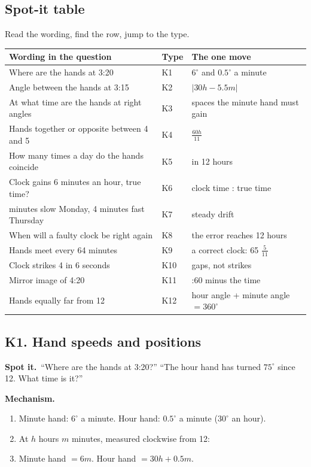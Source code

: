 \documentclass[11pt,a4paper]{article}
\let\oldsubsection\subsection
\renewcommand{\subsection}{\needspace{9\baselineskip}\oldsubsection}
\newcommand{\spot}{\textbf{\color{ember}Spot it.}\ }
\newcommand{\mech}{\textbf{\color{ember}Mechanism.}\ }
\begin{document}
\subsection*{Spot-it table}
Read the wording, find the row, jump to the type.
\begin{center}\small\renewcommand{\arraystretch}{1.18}\setlength{\tabcolsep}{7pt}
\begin{tabularx}{\linewidth}{@{}>{\raggedright\arraybackslash}X l >{\raggedright\arraybackslash}X@{}}
\toprule
\textbf{\color{slate}Wording in the question} & \textbf{\color{slate}Type} & \textbf{\color{slate}The one move} \\ \midrule
Where are the hands at 3:20 & K1 & $6^\circ$ and $0.5^\circ$ a minute \\
Angle between the hands at 3:15 & K2 & $|30h - 5.5m|$ \\
At what time are the hands at right angles & K3 & spaces the minute hand must gain \\
Hands together or opposite between 4 and 5 & K4 & $\frac{60h}{11}$ \\
How many times a day do the hands coincide & K5 & 11 in 12 hours \\
Clock gains 6 minutes an hour, true time? & K6 & clock time : true time \\
2 minutes slow Monday, 4 minutes fast Thursday & K7 & steady drift \\
When will a faulty clock be right again & K8 & the error reaches 12 hours \\
Hands meet every 64 minutes & K9 & a correct clock: 65 $\frac{5}{11}$ \\
Clock strikes 4 in 6 seconds & K10 & gaps, not strikes \\
Mirror image of 4:20 & K11 & 11:60 minus the time \\
Hands equally far from 12 & K12 & hour angle + minute angle $=360^\circ$ \\
\bottomrule
\end{tabularx}\end{center}

\subsection{K1. Hand speeds and positions}
\spot ``Where are the hands at 3:20?'' ``The hour hand has turned $75^\circ$ since 12. What time is it?''

\mech
\begin{enumerate}
\item Minute hand: $6^\circ$ a minute. Hour hand: $0.5^\circ$ a minute ($30^\circ$ an hour).
\item At $h$ hours $m$ minutes, measured clockwise from 12:
\item Minute hand $= 6m$. Hour hand $= 30h + 0.5m$.
\end{enumerate}
\end{document}
